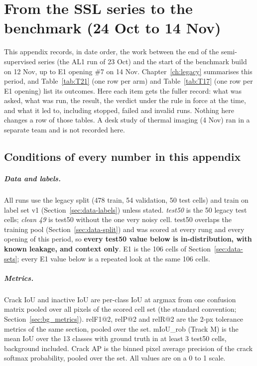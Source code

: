 \chapter{From the SSL series to the benchmark (24 Oct to 14 Nov)}\label{app:midnov}

This appendix records, in date order, the work between the end of the semi-supervised series (the AL1 run of 23 Oct) and the
start of the benchmark build on 12 Nov, up to E1 opening \#7 on 14 Nov. Chapter~\ref{ch:legacy} summarises this period, and
Table~\ref{tab:T21} (one row per arm) and Table~\ref{tab:T17} (one row per E1 opening) list its outcomes. Here each item gets the
fuller record: what was asked, what was run, the result, the verdict under the rule in force at the time, and what it led to,
including stopped, failed and invalid runs. Nothing here changes a row of those tables. A desk study of thermal imaging (4 Nov) ran
in a separate team and is not recorded here.

\section{Conditions of every number in this appendix}\label{sec:midnov-conditions}

\paragraph{Data and labels.} All runs use the legacy split (478 train, 54 validation, 50 test cells) and train on label set v1
(Section~\ref{sec:data-labels}) unless stated. \emph{test50} is the 50 legacy test cells; \emph{clean 49} is test50 without the one
very noisy cell. test50 overlaps the training pool (Section~\ref{sec:data-split}) and was scored at every rung and every opening of
this period, so \textbf{every test50 value below is in-distribution, with known leakage, and context only}. E1 is the 106 cells of
Section~\ref{sec:data-sets}; every E1 value below is a repeated look at the same 106 cells.

\paragraph{Metrics.} Crack IoU and inactive IoU are per-class IoU at argmax from one confusion matrix pooled over all pixels of the
scored cell set (the standard convention; Section~\ref{sec:bg_metrics}). relF1@2, relP@2 and relR@2 are the 2-px tolerance metrics
of the same section, pooled over the set. mIoU\_rob (Track M) is the mean IoU over the 13 classes with ground truth in at least 3
test50 cells, background included. Crack AP is the binned pixel average precision of the crack softmax probability, pooled over
the set. All values are on a 0 to 1 scale.

